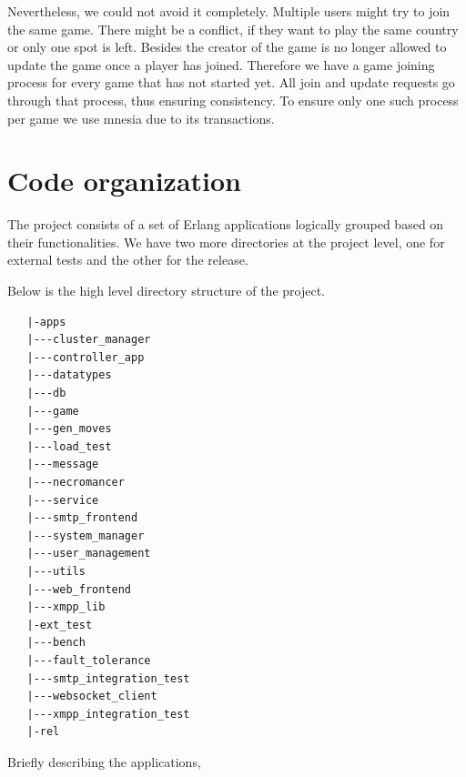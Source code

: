 \documentclass[11pt,a4paper]{report}
\begin{document}
Nevertheless, we could not avoid it completely.
Multiple users might try to join the same game.
There might be a conflict, if they want to play the same country or only one spot is left.
Besides the creator of the game is no longer allowed to update the game once a player has joined.
Therefore we have a game joining process for every game that has not started yet.
All join and update requests go through that process, thus ensuring consistency.
To ensure only one such process per game we use mnesia due to its transactions.

\section{Code organization}

The project consists of a set of Erlang applications logically grouped
based on their functionalities. We have two more directories at the
project level, one for external tests and the other for the release.

Below is the high level directory structure of the project.

\begin{verbatim}
   |-apps
   |---cluster_manager
   |---controller_app
   |---datatypes
   |---db
   |---game
   |---gen_moves
   |---load_test
   |---message
   |---necromancer
   |---service
   |---smtp_frontend
   |---system_manager
   |---user_management
   |---utils
   |---web_frontend
   |---xmpp_lib
   |-ext_test
   |---bench
   |---fault_tolerance
   |---smtp_integration_test
   |---websocket_client
   |---xmpp_integration_test
   |-rel
\end{verbatim}

Briefly describing the applications,
\end{document}
